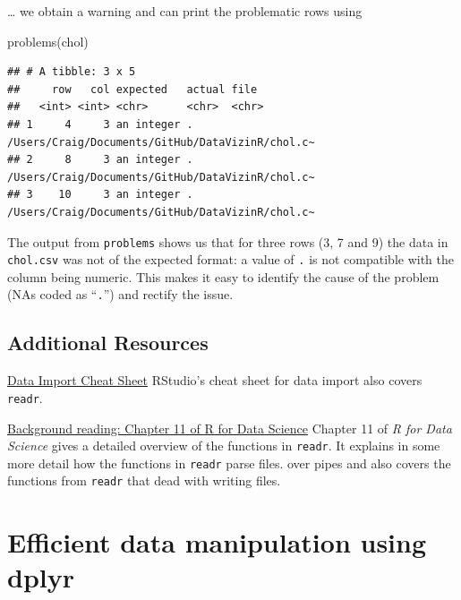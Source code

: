 \documentclass[
]{book}
\newenvironment{Shaded}{\begin{snugshade}}{\end{snugshade}}
\newcommand{\FunctionTok}[1]{\textcolor[rgb]{0.00,0.00,0.00}{#1}}
\newcommand{\NormalTok}[1]{#1}
\begin{document}
\ldots{} we obtain a warning and can print the problematic rows using

\begin{Shaded}
\begin{Highlighting}[]
\FunctionTok{problems}\NormalTok{(chol)}
\end{Highlighting}
\end{Shaded}

\begin{verbatim}
## # A tibble: 3 x 5
##     row   col expected   actual file                                            
##   <int> <int> <chr>      <chr>  <chr>                                           
## 1     4     3 an integer .      /Users/Craig/Documents/GitHub/DataVizinR/chol.c~
## 2     8     3 an integer .      /Users/Craig/Documents/GitHub/DataVizinR/chol.c~
## 3    10     3 an integer .      /Users/Craig/Documents/GitHub/DataVizinR/chol.c~
\end{verbatim}

The output from \texttt{problems} shows us that for three rows (3, 7 and 9) the data in \texttt{chol.csv} was not of the expected format: a value of \texttt{.} is not compatible with the column being numeric. This makes it easy to identify the cause of the problem (NAs coded as ``\texttt{.}'') and rectify the issue.

\hypertarget{additional-resources-1}{%
\subsection{Additional Resources}\label{additional-resources-1}}

\href{\%22https://github.com/rstudio/cheatsheets/raw/main/data-import.pdf\%22}{Data Import Cheat Sheet}
RStudio's cheat sheet for data import also covers \texttt{readr}.

\href{\%22http://r4ds.had.co.nz/data-import.html\%22}{Background reading: Chapter 11 of R for Data Science}
Chapter 11 of \emph{R for Data Science} gives a detailed overview of the functions in \texttt{readr}. It explains in some more detail how the functions in \texttt{readr} parse files. over pipes and also covers the functions from \texttt{readr} that dead with writing files.

\hypertarget{efficient-data-manipulation-using-dplyr}{%
\section{Efficient data manipulation using dplyr}\label{efficient-data-manipulation-using-dplyr}}
\end{document}
